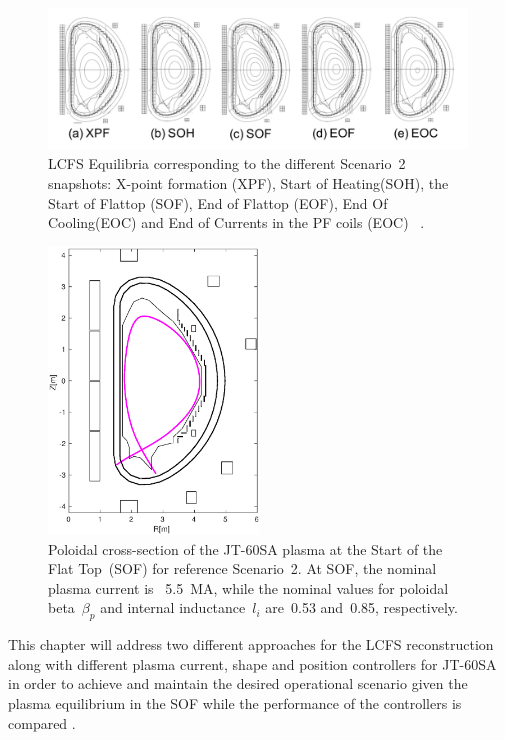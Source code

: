 \begin{figure}[h]
	\centering
	\includegraphics[width=0.99\textwidth]{Chp3/scenario2SnapShots.png}
	
	\caption{LCFS Equilibria corresponding to the different Scenario~2 snapshots:  X-point formation (XPF), Start of Heating(SOH), the Start of Flattop (SOF), End of Flattop (EOF), End Of Cooling(EOC) and  End of Currents in the PF coils (EOC) ~\cite{JT60SA:PID}. \label{Scen2}}
\end{figure}


\begin{figure}[h]
	\centering
	\includegraphics[width=0.5\textwidth]{Chp3/scenario2_SOF.eps}
	
	\caption{Poloidal cross-section of the JT-60SA plasma at the Start of the Flat Top~(SOF) for reference Scenario~2. At SOF, the nominal plasma current is ~5.5~MA, while the nominal values for poloidal beta~$\beta_p$ and internal inductance~$l_i$ are~0.53 and~0.85, respectively.	\label{SOF}}
\end{figure}



This chapter will address two different approaches for the LCFS reconstruction along  with different plasma current, shape and position controllers for JT-60SA in order to achieve and maintain the desired operational scenario given the plasma equilibrium in the SOF while the performance of the controllers is compared .



